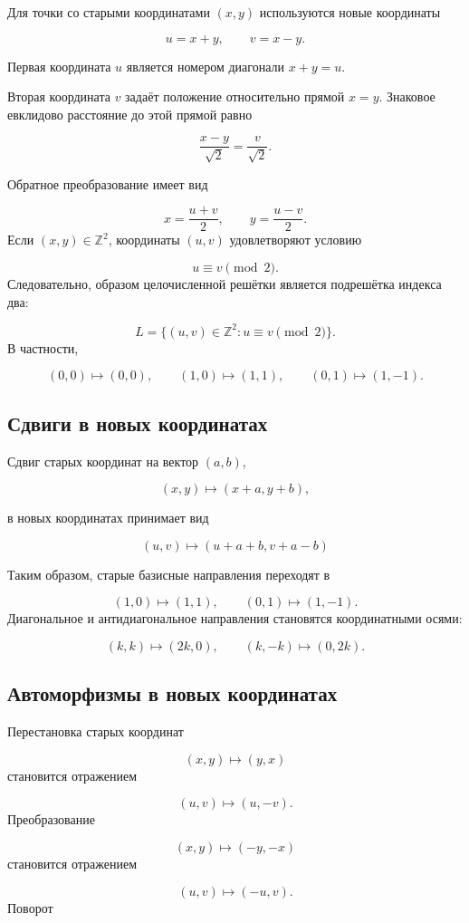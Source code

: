Для точки со старыми координатами $(x,y)$ используются новые координаты

$$u=x+y,\qquad v=x-y.$$

Первая координата $u$ является номером диагонали $x+y=u$.

Вторая координата $v$ задаёт положение относительно прямой $x=y$. Знаковое
евклидово расстояние до этой прямой равно

$$\frac{x-y}{\sqrt2}=\frac{v}{\sqrt2}.$$

Обратное преобразование имеет вид

$$x=\frac{u+v}{2},\qquad y=\frac{u-v}{2}.$$
Если $(x,y)\in\mathbb Z^2$, координаты $(u,v)$ удовлетворяют условию

$$u\equiv v\pmod2.$$
Следовательно, образом целочисленной решётки является подрешётка индекса два:

$$L=\{(u,v)\in\mathbb Z^2:u\equiv v\pmod2\}.$$
В частности,

$$(0,0)\mapsto(0,0), \qquad (1,0)\mapsto(1,1), \qquad (0,1)\mapsto(1,-1).$$

\subsection{Сдвиги в новых координатах}

Сдвиг старых координат на вектор $(a,b)$,

$$(x,y)\mapsto(x+a,y+b),$$

в новых координатах принимает вид

$$(u,v)\mapsto(u+a+b,v+a-b)$$

Таким образом, старые базисные направления переходят в

$$(1,0)\mapsto(1,1), \qquad (0,1)\mapsto(1,-1).$$
Диагональное и антидиагональное направления становятся координатными осями:

$$(k,k)\mapsto(2k,0), \qquad (k,-k)\mapsto(0,2k).$$
\subsection{Автоморфизмы в новых координатах}

Перестановка старых координат

$$(x,y)\mapsto(y,x)$$
становится отражением

$$(u,v)\mapsto(u,-v).$$
Преобразование

$$(x,y)\mapsto(-y,-x)$$
становится отражением

$$(u,v)\mapsto(-u,v).$$
Поворот

